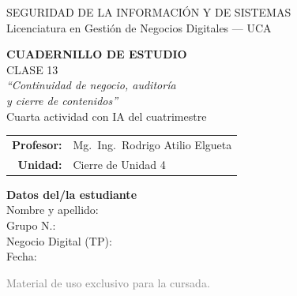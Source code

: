 \documentclass[12pt,a4paper]{article}
\begin{document}
\begin{titlepage}
\centering
\vspace*{1cm}

\begin{cajaTitulo}[width=\textwidth, halign=center]
  SEGURIDAD DE LA INFORMACI\'ON Y DE SISTEMAS\\[4pt]
  {\large Licenciatura en Gesti\'on de Negocios Digitales --- UCA}
\end{cajaTitulo}

\vspace{1.2cm}

{\Huge\bfseries\color{azulUCA} CUADERNILLO DE ESTUDIO}\\[8pt]
{\LARGE\color{doradoUCA} CLASE 13}\\[10pt]
{\Large\itshape ``Continuidad de negocio, auditor\'ia\\[2pt] y cierre de contenidos''}\\[6pt]
{\large\color{violetaIA}\; Cuarta actividad con IA del cuatrimestre}\\[1.5cm]

\begin{tabular}{rl}
\textbf{Profesor:}   & Mg.\ Ing.\ Rodrigo Atilio Elgueta \\[4pt]
\textbf{Unidad:}     & Cierre de Unidad 4 \\[4pt]
\end{tabular}

\vfill

\begin{tcolorbox}[colback=grisClaro, colframe=azulUCA, arc=3mm, width=0.9\textwidth]
  \centering
  {\bfseries Datos del/la estudiante}\\[10pt]
  Nombre y apellido: \underline{\hspace{5cm}}\\[10pt]
  Grupo N.\textdegree: \underline{\hspace{5cm}}\\[10pt]
  Negocio Digital (TP): \underline{\hspace{5cm}}\\[10pt]
  Fecha: \underline{\hspace{5cm}}
\end{tcolorbox}

\vspace{1cm}
{\small\textcolor{gray}{Material de uso exclusivo para la cursada.}}
\end{titlepage}
\end{document}
